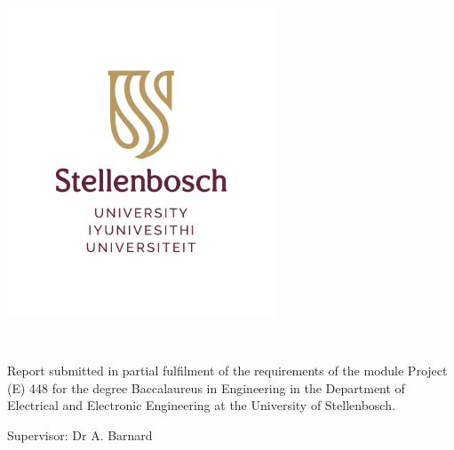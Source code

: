 \graphicspath{{./figures/}}

\begin{titlepage}
\begin{center}

\includegraphics[width=8cm]{SU_logo_RGB_without_slogan.pdf}


\vfill

{\sffamily \bfseries \huge \reportTitle \par}

{\sffamily \bfseries \Large \reportSubtitle \par}

\vfill

{\large {\Large \nameFull} \\ \stNumber \par}

Report submitted in partial fulfilment of the requirements of the module
Project (E) 448 for the degree Baccalaureus in Engineering in the Department of Electrical
and Electronic Engineering at the University of Stellenbosch.


\vfill

\vfill
Supervisor: Dr A. Barnard

\vfill

\vfill

{\Large \myDate}
\end{center}
\end{titlepage}
